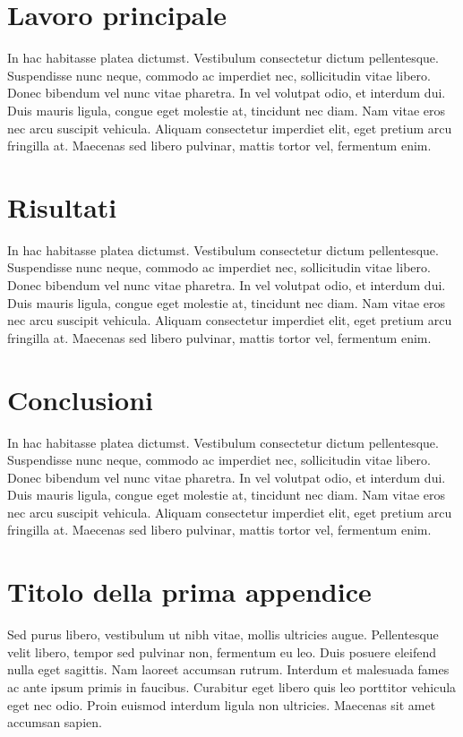 \documentclass[target=bach,aauheader=,style=]{thud}
\begin{document}
\chapter{Lavoro principale}
In hac habitasse platea dictumst. Vestibulum consectetur dictum pellentesque. Suspendisse nunc neque, commodo ac imperdiet nec, sollicitudin vitae libero. Donec bibendum vel nunc vitae pharetra. In vel volutpat odio, et interdum dui. Duis mauris ligula, congue eget molestie at, tincidunt nec diam. Nam vitae eros nec arcu suscipit vehicula. Aliquam consectetur imperdiet elit, eget pretium arcu fringilla at. Maecenas \cite{Knu86} sed libero pulvinar, mattis tortor vel, fermentum enim.


\chapter{Risultati}
In hac habitasse platea dictumst. Vestibulum consectetur dictum pellentesque. Suspendisse nunc neque, commodo ac imperdiet nec, sollicitudin vitae libero. Donec bibendum vel nunc vitae pharetra. In vel volutpat odio, et interdum dui. Duis mauris ligula, congue eget molestie at, tincidunt nec diam. Nam vitae eros nec arcu suscipit vehicula. Aliquam consectetur imperdiet elit, eget pretium arcu fringilla at. Maecenas \cite{Knu86} sed libero pulvinar, mattis tortor vel, fermentum enim.


\chapter{Conclusioni}
In hac habitasse platea dictumst. Vestibulum consectetur dictum pellentesque. Suspendisse nunc neque, commodo ac imperdiet nec, sollicitudin vitae libero. Donec bibendum vel nunc vitae pharetra. In vel volutpat odio, et interdum dui. Duis mauris ligula, congue eget molestie at, tincidunt nec diam. Nam vitae eros nec arcu suscipit vehicula. Aliquam consectetur imperdiet elit, eget pretium arcu fringilla at. Maecenas \cite{Knu86} sed libero pulvinar, mattis tortor vel, fermentum enim.

\appendix


\chapter{Titolo della prima appendice}
Sed purus libero, vestibulum ut nibh vitae, mollis ultricies augue. Pellentesque velit libero, tempor sed pulvinar non, fermentum eu leo. Duis posuere eleifend nulla eget sagittis. Nam laoreet accumsan rutrum. Interdum et malesuada fames ac ante ipsum primis in faucibus. Curabitur eget libero quis leo porttitor vehicula eget nec odio. Proin euismod interdum ligula non ultricies. Maecenas sit amet accumsan sapien.
\end{document}

